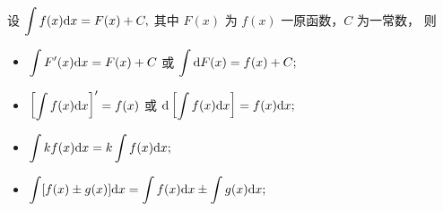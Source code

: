\begin{Field}[不定积分基本性质]

    设 $\displaystyle \int f(x)\mathrm{d}x = F(x)+C, $ 其中 $ F(x) $ 为 $ f(x) $ 一原函数，$ C $ 为一常数，
    则\begin{itemize}
        \item $\displaystyle \int F'(x)\mathrm{d}x=F(x)+C $ 或 $\displaystyle \int \mathrm{d}F(x)=f(x)+C ; $
        \item $\displaystyle \left[\int f(x)\mathrm{d}x\right]'=f(x) $ 
        或 $\displaystyle \mathrm{d}\left[\int f(x)\mathrm{d}x\right]=f(x)\mathrm{d}x ; $
        \item $\displaystyle \int kf(x)\mathrm{d}x = k\int f(x)\mathrm{d}x ; $
        \item $\displaystyle \int [f(x)\pm g(x)]\mathrm{d}x = \int f(x)\mathrm{d}x \pm \int g(x)\mathrm{d}x ; $
    \end{itemize}
\end{Field}



